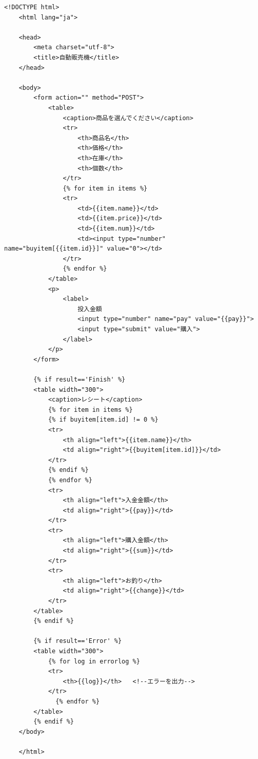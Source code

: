 \documentclass[12pt]{jarticle}
\begin{document}
\clearpage
\begin{lstlisting}[style = lsthtml,caption=machine.html]
    <!DOCTYPE html>
    <html lang="ja">
    
    <head>
        <meta charset="utf-8">
        <title>自動販売機</title>
    </head>
    
    <body>
        <form action="" method="POST">
            <table>
                <caption>商品を選んでください</caption>
                <tr>
                    <th>商品名</th>
                    <th>価格</th>
                    <th>在庫</th>
                    <th>個数</th>
                </tr>
                {% for item in items %}
                <tr>
                    <td>{{item.name}}</td>
                    <td>{{item.price}}</td>
                    <td>{{item.num}}</td>
                    <td><input type="number" name="buyitem[{{item.id}}]" value="0"></td>
                </tr>
                {% endfor %}
            </table>
            <p>
                <label>
                    投入金額
                    <input type="number" name="pay" value="{{pay}}">
                    <input type="submit" value="購入">
                </label>
            </p>
        </form>
    
        {% if result=='Finish' %}
        <table width="300">
            <caption>レシート</caption>
            {% for item in items %}
            {% if buyitem[item.id] != 0 %}
            <tr>
                <th align="left">{{item.name}}</th>
                <td align="right">{{buyitem[item.id]}}</td>
            </tr>
            {% endif %}
            {% endfor %}
            <tr>
                <th align="left">入金金額</th>
                <td align="right">{{pay}}</td>
            </tr>
            <tr>
                <th align="left">購入金額</th>
                <td align="right">{{sum}}</td>
            </tr>
            <tr>
                <th align="left">お釣り</th>
                <td align="right">{{change}}</td>
            </tr>
        </table>
        {% endif %}
    
        {% if result=='Error' %}
        <table width="300">
            {% for log in errorlog %}
            <tr>
                <th>{{log}}</th>   <!--エラーを出力-->
            </tr>
              {% endfor %}
        </table>
        {% endif %}
    </body>
    
    </html>
    \end{lstlisting}
\end{document}
